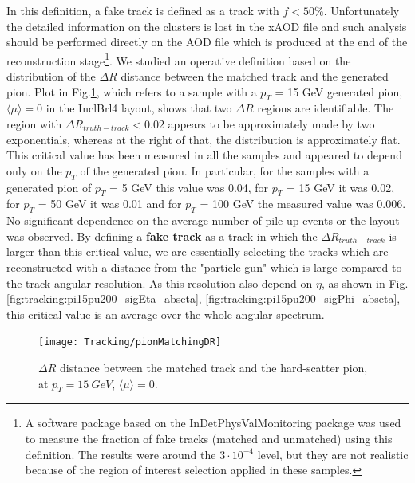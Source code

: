 \documentclass[a4paper,twoside,12pt]{book}
\begin{document}
In this definition, a fake track is defined as a track with $f < 50\%$. Unfortunately the detailed information on the clusters is lost in the xAOD file and such analysis should be performed directly on the AOD file
which is produced at the end of the reconstruction stage\footnote{A software package based on the InDetPhysValMonitoring package was used to measure the fraction of fake tracks (matched and unmatched) using this definition. The results were around the $3\cdot 10^{-4}$ level, but they are not realistic because of the region of interest selection applied in these samples.}. We studied an operative definition based on the distribution of the $\Delta R$ distance between the matched track and
the generated pion. Plot in Fig.\ref{fig:tracking:pionMatchingDR}, which refers to a sample with a $p_{T}$ = 15 GeV generated pion, $\langle\mu\rangle = 0$ in the InclBrl4 layout, shows 
that two $\Delta R$ regions are identifiable. The region with $\Delta R_{truth-track} < 0.02$ appears to be approximately made by two exponentials, whereas at the right of that, the distribution is approximately flat. This critical value has been measured in all the samples and appeared to depend only on the $p_{T}$ of the generated pion. In particular, for the samples with a generated pion of $p_{T}$ = 5 GeV this value was 0.04, for $p_{T}$ = 15 GeV it was 0.02, for $p_{T}$ = 50 GeV it was 0.01 and for $p_{T}$ = 100 GeV the measured value was 0.006. No significant dependence on the average number of pile-up events or the layout was observed. By defining
a \textbf{fake track} as a track in which the $\Delta R_{truth-track}$ is larger than this critical value, we are essentially selecting the tracks
which are reconstructed with a distance from the "particle gun" which is large compared to the track angular resolution. As this resolution also depend on $\eta$, as shown in Fig.
\ref{fig:tracking:pi15pu200_sigEta_abseta}, \ref{fig:tracking:pi15pu200_sigPhi_abseta}, this critical value is an average over the whole angular spectrum.\\

\begin{figure}
\centering
\texttt{[image: Tracking/pionMatchingDR]}
\caption{$\Delta R$ distance between the matched track and the hard-scatter pion, at $p_{T} = 15\ GeV$, $\langle\mu\rangle = 0$.} 
\label{fig:tracking:pionMatchingDR}
\end{figure}
\end{document}

